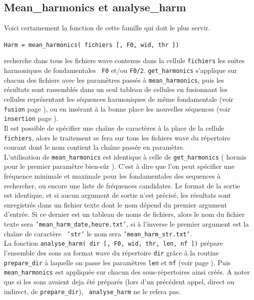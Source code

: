     \newpage
    \subsection{Mean\_harmonics et analyse\_harm}
    \label{meanharmonics}
    Voici certainement la fonction de cette famille qui doit le
    plus servir.
    \begin{center}
    {\tt Harm = mean\_harmonics( fichiers [, F0, wid, thr ]) }
    \end{center}
    recherche dans tous les fichiers wave contenus dans la cellule
    {\tt fichiers} les suites harmoniques de fondamentales {\tt
    F0} et/ou {\tt F0/2}. {\tt get\_harmonics} s'applique sur
    chacun des fichiers avec les param{\`e}tres pass{\'e}s {\`a}
    {\tt mean\_harmonics}, puis les r{\'e}sultats sont rassembl{\'e}s dans un
    seul tableau de cellules en fusionnant les cellules repr{\'e}sentant les
    s{\'e}quences harmoniques de m{\^e}me fondamentale (voir {\tt fusion}
    page \pageref{fusion}), ou en ins{\'e}rant {\`a} la bonne place les
    nouvelles s{\'e}quences (voir {\tt insertion} page
    \pageref{insertion}).\\

    Il est possible de sp{\'e}cifier une cha{\^\i}ne de caract{\`e}res {\`a} la
    place de la cellule {\tt fichiers}, alors le traitement se
    fera sur tous les fichiers wave du r{\'e}pertoire courant dont le
    nom contient la cha{\^\i}ne pass{\'e}e en param{\`e}tre.\\

    L'utilisation de {\tt mean\_harmonics} est identique {\`a} celle
    de {\tt get\_harmonics} ( hormis pour le premier param{\`e}tre
    bien-s{\^u}r ). C'est {\`a} dire que l'on peut sp{\'e}cifier une fr{\'e}quence
    minimale et maximale pour les fondamentales des sequences {\`a}
    rechercher, ou encore une liste de fr{\'e}quences candidates. Le
    format de la sortie est identique, et si aucun argument de
    sortie n'est pr{\'e}cis{\'e}, les r{\'e}sultats sont enregistr{\'e}s dans un
    fichier texte dont le nom d{\'e}pend du premier argument d'entr{\'e}e.
    Si ce dernier est un tableau de noms de fichiers, alors le
    nom du fichier texte sera {\tt 'mean\_harm\_date,heure.txt'}, si {\`a}
    l'inverse le premier argument est la cha{\^\i}ne de caract{\`e}re {\tt
    'str'} le nom sera {\tt 'mean\_harm\_str.txt'}.\\

    La fonction {\tt analyse\_harm( dir [, F0, wid, thr, len, nf
    ])} pr{\'e}pare l'ensemble des sons au format wave du r{\'e}pertoire
    {\tt dir} gr{\^a}ce {\`a} la routine {\tt prepare\_dir} {\`a} laquelle on
    passe les param{\`e}tres {\tt len} et {\tt nf} (voir page
    \pageref{preparedir}). Puis {\tt mean\_harmonics} est
    appliqu{\'e}e sur chacun des sous-r{\'e}pertoires ainsi cr{\'e}{\'e}s. A noter
    que si les sons avaient deja {\'e}t{\'e} pr{\'e}par{\'e}s (lors d'un pr{\'e}c{\'e}dent
    appel, direct ou indirect, de {\tt prepare\_dir}), {\tt
    analyse\_harm} ne le refera pas.

